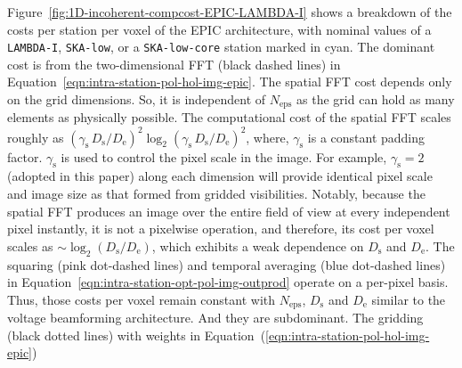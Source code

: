 \documentclass[
  journal=pasa,
  manuscript=article-type,
  year=2020,
  volume=37,
]{cup-journal}
\begin{document}

Figure~\ref{fig:1D-incoherent-compcost-EPIC-LAMBDA-I} shows a breakdown of the costs per station per voxel of the EPIC architecture, with nominal values of a \texttt{LAMBDA-I}, \texttt{SKA-low}, or a \texttt{SKA-low-core} station marked in cyan. The dominant cost is from the two-dimensional FFT (black dashed lines) in Equation~\ref{eqn:intra-station-pol-hol-img-epic}.
The spatial FFT cost depends only on the grid dimensions. So, it is independent of $N_\textrm{eps}$ as the grid can hold as many elements as physically possible. The computational cost of the spatial FFT scales roughly as $(\gamma_\textrm{s} \, D_\textrm{s}/D_\textrm{e})^2\log_2(\gamma_\textrm{s}\, D_\textrm{s}/D_\textrm{e})^2$, where, $\gamma_\textrm{s}$ is a constant padding factor. $\gamma_\textrm{s}$ is used to control the pixel scale in the image. For example, $\gamma_\textrm{s}=2$ (adopted in this paper) along each dimension will provide identical pixel scale and image size as that formed from gridded visibilities. Notably, because the spatial FFT produces an image over the entire field of view at every independent pixel instantly, it is not a pixelwise operation, and therefore, its cost per voxel scales as $\sim \log_2(D_\textrm{s}/D_\textrm{e})$, which exhibits a weak dependence on $D_\textrm{s}$ and $D_\textrm{e}$. The squaring (pink dot-dashed lines) and temporal averaging (blue dot-dashed lines) in Equation~\ref{eqn:intra-station-opt-pol-img-outprod} operate on a per-pixel basis. Thus, those costs per voxel remain constant with $N_\textrm{eps}$, $D_\textrm{s}$ and $D_\textrm{e}$ similar to the voltage beamforming architecture. And they 
are subdominant. The gridding (black dotted lines) with weights in Equation~(\ref{eqn:intra-station-pol-hol-img-epic})
\end{document}
